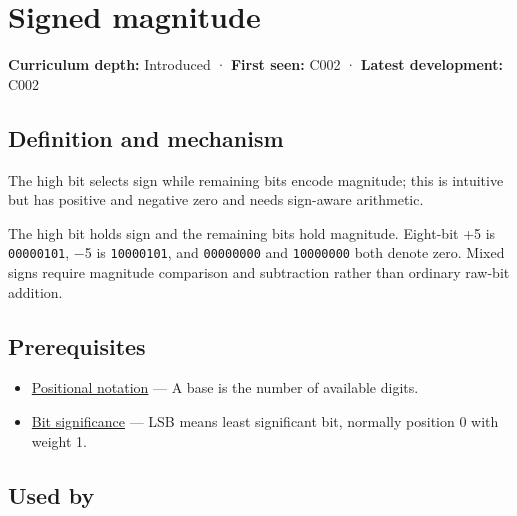 \hypertarget{appendix-ce20506c8532}{}\label{referencestart:appendix-ce20506c8532}
\section{Signed magnitude}\label{appendix-ce20506c8532-signed-magnitude}

\hypertarget{appendix-ce20506c8532-signed-magnitude}{}

\textbf{Curriculum depth:} Introduced · \textbf{First seen:} C002 · \textbf{Latest development:} C002

\begin{allmightroledefinition}

\subsection{Definition and mechanism}\label{appendix-ce20506c8532-definition-and-mechanism}

\hypertarget{appendix-ce20506c8532-definition-and-mechanism}{}

The high bit selects sign while remaining bits encode magnitude; this is intuitive but has positive and negative zero and needs sign-aware arithmetic.

\end{allmightroledefinition}

The high bit holds sign and the remaining bits hold magnitude. Eight-bit +5 is \texttt{00000101}, −5 is \texttt{10000101}, and \texttt{00000000} and \texttt{10000000} both denote zero. Mixed signs require magnitude comparison and subtraction rather than ordinary raw-bit addition.

\subsection{Prerequisites}\label{appendix-ce20506c8532-prerequisites}

\hypertarget{appendix-ce20506c8532-prerequisites}{}

\begin{itemize}
\tightlist
\item
  \hyperref[appendix-83c3f28f7bda]{Positional notation} --- A base is the number of available digits.
\item
  \hyperref[appendix-280445746493]{Bit significance} --- LSB means least significant bit, normally position 0 with weight 1.
\end{itemize}

\subsection{Used by}\label{appendix-ce20506c8532-used-by}

